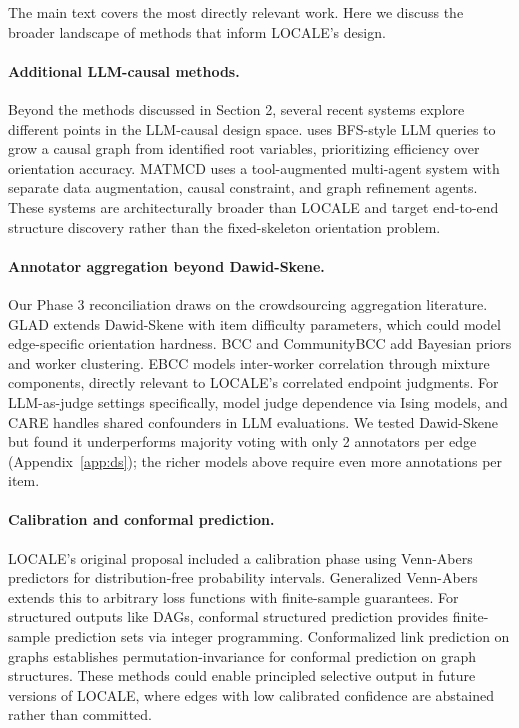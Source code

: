\documentclass{article}
\begin{document}
The main text covers the most directly relevant work. Here we discuss the broader landscape of methods that inform LOCALE's design.

\paragraph{Additional LLM-causal methods.}
Beyond the methods discussed in Section 2, several recent systems explore different points in the LLM-causal design space. \citet{jiralerspong2024efficient} uses BFS-style LLM queries to grow a causal graph from identified root variables, prioritizing efficiency over orientation accuracy. MATMCD \citep{shen2025matmcd} uses a tool-augmented multi-agent system with separate data augmentation, causal constraint, and graph refinement agents. These systems are architecturally broader than LOCALE and target end-to-end structure discovery rather than the fixed-skeleton orientation problem.

\paragraph{Annotator aggregation beyond Dawid-Skene.}
Our Phase 3 reconciliation draws on the crowdsourcing aggregation literature. GLAD \citep{whitehill2009glad} extends Dawid-Skene with item difficulty parameters, which could model edge-specific orientation hardness. BCC \citep{kim2012bcc} and CommunityBCC \citep{venanzi2014communitybcc} add Bayesian priors and worker clustering. EBCC \citep{li2019ebcc} models inter-worker correlation through mixture components, directly relevant to LOCALE's correlated endpoint judgments. For LLM-as-judge settings specifically, \citet{balasubramanian2026ising} model judge dependence via Ising models, and CARE \citep{zhao2026care} handles shared confounders in LLM evaluations. We tested Dawid-Skene but found it underperforms majority voting with only 2 annotators per edge (Appendix~\ref{app:ds}); the richer models above require even more annotations per item.

\paragraph{Calibration and conformal prediction.}
LOCALE's original proposal included a calibration phase using Venn-Abers predictors for distribution-free probability intervals. Generalized Venn-Abers \citep{vanderlaan2025gva} extends this to arbitrary loss functions with finite-sample guarantees. For structured outputs like DAGs, conformal structured prediction \citep{zhang2025conformal} provides finite-sample prediction sets via integer programming. Conformalized link prediction on graphs \citep{zhao2024clp} establishes permutation-invariance for conformal prediction on graph structures. These methods could enable principled selective output in future versions of LOCALE, where edges with low calibrated confidence are abstained rather than committed.
\end{document}
